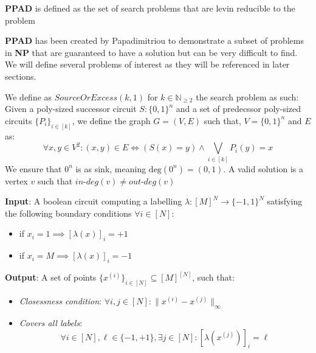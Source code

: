 \begin{definition}
    \textbf{PPAD} is defined as the set of search problems that
    are levin reducible to the  problem
\end{definition}


\textbf{PPAD} has been created by Papadimitriou \cite{papadimitriouComplexityParityArgument1994}
to demonstrate a subset of problems in \textbf{NP} that are guaranteed to have
a solution but can be very difficult to find. We will define
several problems of interest as they will be referenced in later sections.

\begin{definition}
    We define as $\textit{SourceOrExcess}(k,1)$ for $k \in \mathbb{N}_{\geq 2}$
    the search problem as such: Given a poly-sized successor circuit $S : \{0,1\}^n$
    and a set of predecssor poly-sized circuits $\{P_i\}_{i \in [k]}$, we define
    the graph $G = (V,E)$ such that, $V = \{0,1\}^n$ and $E$ as:
    $$
    \forall x, y \in V^2: (x,y) \in E \iff (S(x) = y) \wedge \bigvee_{i \in [k]} P_i(y) = x
    $$
    We ensure that $0^n$ is as sink, meaning $\text{deg}(0^n) = (0,1)$.
    A valid solution is a vertex $v$ such that $\textit{in-deg}(v) \neq \textit{out-deg}(v)$
\end{definition}



\begin{definition}
    \textbf{Input}: A boolean circuit computing a labelling $\lambda: [M]^N \to \{-1, 1\}^N$
    satisfying the following boundary conditions $\forall i \in [N]$:
    \begin{itemize}
        \item if $x_i = 1 \implies [\lambda(x)]_i = +1$
        \item if $x_i = M \implies [\lambda(x)]_i = -1$
    \end{itemize}
    \textbf{Output}: A set of points $\{x^{(i)}\}_{i \in [N]} \subseteq [M]^{[N]}$, such that:
    \begin{itemize}
        \item \textit{Closessness condition}: $\forall i,j \in [N]: \|x^{(i)} - x^{(j)}\|_{\infty}$
        \item \textit{Covers all labels}:
            $$
            \forall i \in [N], \ell \in \{-1, +1\}, \exists j \in [N]: [\lambda(x^{(j)})]_{i} = \ell
            $$
    \end{itemize}
\end{definition}


